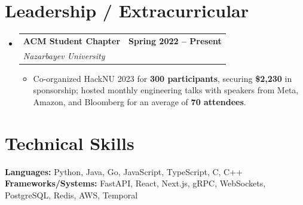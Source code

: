 \documentclass[letterpaper,10pt]{article}
\makeatletter
\newcommand{\resumeItem}[1]{
  \item\small{
    {#1 \vspace{-4pt}}
  }
}
\newcommand{\resumeItem}[1]{
  \item\small{
    {#1 \vspace{-2pt}}
  }
}
\newcommand{\resumeSubheading}[4]{
  \vspace{-2pt}\item
    \begin{tabular*}{1.0\textwidth}[t]{l@{\extracolsep{\fill}}r}
      \textbf{#1} & \textbf{\small #2} \\
      \textit{\small#3} & \textit{\small #4} \\
    \end{tabular*}\vspace{-7pt}
}
\newcommand{\resumeSubHeadingListStart}{\begin{itemize}[leftmargin=0.0in, label={}]}
\newcommand{\resumeSubHeadingListEnd}{\end{itemize}}
\newcommand{\resumeItemListStart}{\begin{itemize}}
\newcommand{\resumeItemListEnd}{\end{itemize}\vspace{-5pt}}
\makeatother
\begin{document}
\section{Leadership / Extracurricular}
    \resumeSubHeadingListStart
        \resumeSubheading{ACM Student Chapter}{Spring 2022 -- Present}{Nazarbayev University}{}
            \resumeItemListStart [leftmargin=1em]
              \resumeItem{Co-organized HackNU 2023 for \textbf{300 participants}, securing \textbf{\$2,230} in sponsorship; hosted monthly engineering talks with speakers from Meta, Amazon, and Bloomberg for an average of \textbf{70 attendees}.}
            \resumeItemListEnd
        
    \resumeSubHeadingListEnd
%
\section{Technical Skills}
 \begin{itemize}[leftmargin=0.15in, label={}]
    \small{\item{
     \textbf{Languages:} Python, Java, Go, JavaScript, TypeScript, C, C++ \quad
     \textbf{Frameworks/Systems:} FastAPI, React, Next.js, gRPC, WebSockets, PostgreSQL, Redis, AWS, Temporal
    }}
 \end{itemize}
 \vspace{-16pt}


\end{document}
